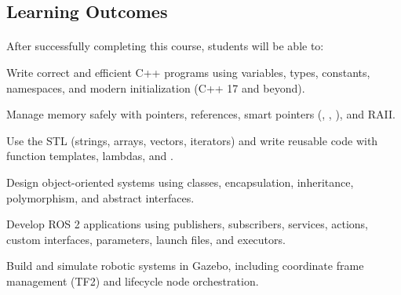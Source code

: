 \documentclass[
    10pt,
    dvipsnames,
    svgnames,
    x11names,
    aspectratio=1610,
    english,
    codeminted]{beamer}
\begin{document}
\subsection*{Learning Outcomes}
\begingroup
\divframetrue
\renewcommand{\divbartextA}{\secname}
\renewcommand{\divbartextB}{}
\begin{frame}{\secname}
  \divbar{\secname}{\subsecname}
  \framesubtitle{\subsecname}
After successfully completing this course, students will be able to:
\begin{compactenum}
    \item Write correct and efficient C++ programs using variables, types, constants, namespaces, and modern initialization (C++ 17 and beyond).
    \item Manage memory safely with pointers, references, smart pointers (, , ), and RAII.
    \item Use the STL (strings, arrays, vectors, iterators) and write reusable code with function templates, lambdas, and .
    \item Design object-oriented systems using classes, encapsulation, inheritance, polymorphism, and abstract interfaces.
    \item Develop ROS 2 applications using publishers, subscribers, services, actions, custom interfaces, parameters, launch files, and executors.
    \item Build and simulate robotic systems in Gazebo, including coordinate frame management (TF2) and lifecycle node orchestration.
\end{compactenum}
\end{frame}
\endgroup

\end{document}
